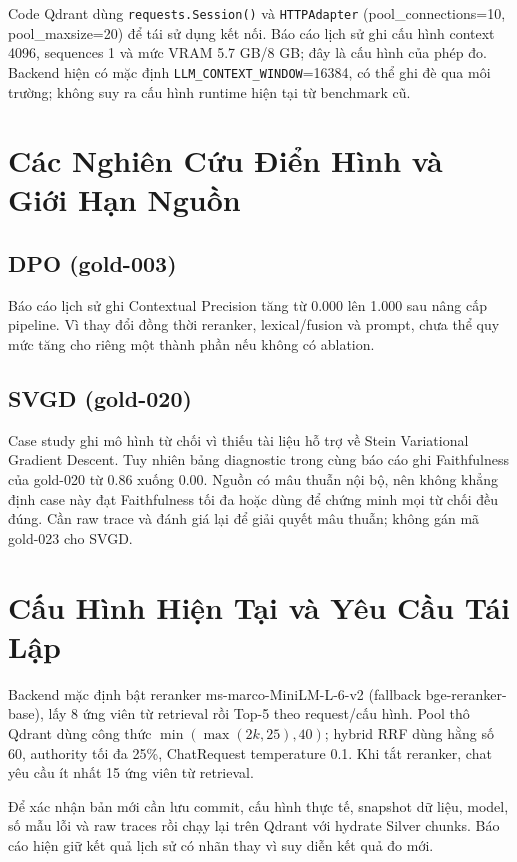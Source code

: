 

Code Qdrant dùng \texttt{requests.Session()} và \texttt{HTTPAdapter} (pool\_connections=10, pool\_maxsize=20) để tái sử dụng kết nối. Báo cáo lịch sử ghi cấu hình context 4096, sequences 1 và mức VRAM 5.7 GB/8 GB; đây là cấu hình của phép đo. Backend hiện có mặc định \texttt{LLM\_CONTEXT\_WINDOW}=16384, có thể ghi đè qua môi trường; không suy ra cấu hình runtime hiện tại từ benchmark cũ.

\section{Các Nghiên Cứu Điển Hình và Giới Hạn Nguồn}
\subsection{DPO (gold-003)}
Báo cáo lịch sử ghi Contextual Precision tăng từ 0.000 lên 1.000 sau nâng cấp pipeline. Vì thay đổi đồng thời reranker, lexical/fusion và prompt, chưa thể quy mức tăng cho riêng một thành phần nếu không có ablation.

\subsection{SVGD (gold-020)}
Case study ghi mô hình từ chối vì thiếu tài liệu hỗ trợ về Stein Variational Gradient Descent. Tuy nhiên bảng diagnostic trong cùng báo cáo ghi Faithfulness của gold-020 từ 0.86 xuống 0.00. Nguồn có mâu thuẫn nội bộ, nên không khẳng định case này đạt Faithfulness tối đa hoặc dùng để chứng minh mọi từ chối đều đúng. Cần raw trace và đánh giá lại để giải quyết mâu thuẫn; không gán mã gold-023 cho SVGD.

\section{Cấu Hình Hiện Tại và Yêu Cầu Tái Lập}
Backend mặc định bật reranker ms-marco-MiniLM-L-6-v2 (fallback bge-reranker-base), lấy 8 ứng viên từ retrieval rồi Top-5 theo request/cấu hình. Pool thô Qdrant dùng công thức $\min(\max(2k,25),40)$; hybrid RRF dùng hằng số 60, authority tối đa 25\%, ChatRequest temperature 0.1. Khi tắt reranker, chat yêu cầu ít nhất 15 ứng viên từ retrieval.

Để xác nhận bản mới cần lưu commit, cấu hình thực tế, snapshot dữ liệu, model, số mẫu lỗi và raw traces rồi chạy lại trên Qdrant với hydrate Silver chunks. Báo cáo hiện giữ kết quả lịch sử có nhãn thay vì suy diễn kết quả đo mới.
